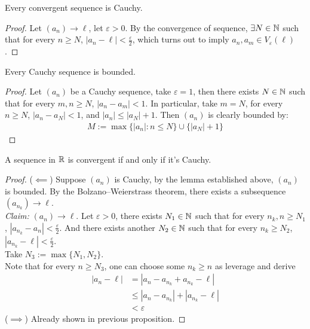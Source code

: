 \documentclass[11pt]{article}
\begin{document}
	\begin{proposition}
		Every convergent sequence is Cauchy.
	\end{proposition}
	
	\begin{proof}
		Let $(a_n) \to \ell$, let $\varepsilon > 0$. By the convergence of sequence, $\exists N \in \mathbb{N}$ such that for every $ n \geq N$, $|a_n - \ell| < \frac{\varepsilon}{2}$, which turns out to imply $a_n, a_m \in V_\varepsilon(\ell)$.
	\end{proof}
	
	\begin{lemma}
		Every Cauchy sequence is bounded.
	\end{lemma}
	
	\begin{proof}
		Let $(a_n)$ be a Cauchy sequence, take $\varepsilon = 1$, then there exists $N \in \mathbb{N}$ such that for every $m, n \geq N$, $|a_n - a_m| < 1$. In particular, take $m = N$, for every $n \geq N$, $|a_n - a_N| < 1$, and $|a_n| \leq |a_N| + 1$. Then $(a_n)$ is clearly bounded by:
		\begin{align}
			M := \max \{|a_n|: n \leq N\} \cup \{|a_N| + 1\}
		\end{align}
	\end{proof}
	
	\begin{theorem}
		A sequence in $\mathbb{R}$ is convergent if and only if it's Cauchy.
	\end{theorem}
	
	\begin{proof}
		($\impliedby$) Suppose $(a_n)$ is Cauchy, by the lemma established above, $(a_n)$ is bounded. By the Bolzano–Weierstrass theorem, there exists a subsequence $(a_{n_k}) \to \ell$. \\
		\emph{Claim:} $(a_n) \to \ell$. Let $\varepsilon > 0$, there exists $N_1 \in \mathbb{N}$ such that for every $n_k, n \geq N_1$, $|a_{n_k} - a_n| < \frac{\varepsilon}{2}$. 
		And there exists another $N_2 \in \mathbb{N}$ such that for every $n_k \geq N_2$, $|a_{n_k} - \ell| < \frac{\varepsilon}{2}$. \\
		Take $N_3 := \max\{N_1, N_2\}$. \\
		Note that for every $n \geq N_3$, one can choose some $n_k \geq n$ as leverage and derive
		\begin{align}
			|a_n - \ell| &= |a_n - a_{n_k} + a_{n_k} - \ell| \\
			&\leq |a_n - a_{n_k}| + |a_{n_k} - \ell| \\
			&< \varepsilon
		\end{align}
		($\implies$) Already shown in previous proposition.
	\end{proof}
	
\end{document}
